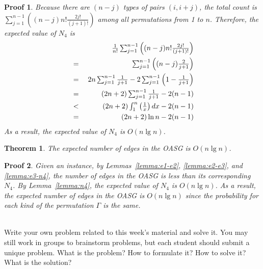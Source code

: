 \documentclass[]{article}
\newtheorem{Proof}{Proof}
\newtheorem{Theorem}{Theorem}
\begin{document}
\begin{qunlist}
{{\begin{Proof}
Because there are $(n-j)$ types of pairs $(i,i+j)$, the total count is $\sum_{j=1}^{n-1}((n-j)n!\frac{2j!}{(j+1)!})$ among all permutations from 1 to $n$. Therefore, the expected value of $N_4$ is
\begin{eqnarray*}
 & {\textstyle        } & {\textstyle \frac{1}{n!}\sum_{j=1}^{n-1}\left((n-j)n!\frac{2j!}{(j+1)!}\right)}            \nonumber\\
 & {\textstyle { }={ }} & {\textstyle \sum_{j=1}^{n-1}\left((n-j)\frac{2}{j+1}\right)}                               \nonumber\\
 & {\textstyle { }={ }} & {\textstyle 2n\sum_{j=1}^{n-1}\frac{1}{j+1}-2\sum_{j=1}^{n-1}\left(1-\frac{1}{j+1}\right)} \nonumber\\
 & {\textstyle { }={ }} & {\textstyle (2n+2)\sum_{j=1}^{n-1}\frac{1}{j+1}-2(n-1)}                                    \nonumber\\
 & {\textstyle { }<{ }} & {\textstyle (2n+2)\int_1^n\left(\frac{1}{x}\right)dx-2(n-1)}                             \nonumber\\
 & {\textstyle { }={ }} & {\textstyle (2n+2)\ln n-2(n-1)}                                                           \nonumber
\end{eqnarray*}
As a result, the expected value of $N_4$ is $O(n\lg n)$.
\end{Proof}

\begin{Theorem}\label{theorem:edge-random-case}
The expected number of edges in the OASG is $O(n\lg n)$.
\end{Theorem}

\begin{Proof}
Given an instance, by Lemmas~\ref{lemma:e1-e2}, \ref{lemma:e2-e3}, and \ref{lemma:e3-n4}, the number of edges in the OASG is less than its corresponding $N_4$. By Lemma~\ref{lemma:n4}, the expected value of $N_4$ is $O(n\lg n)$. As a result, the expected number of edges in the OASG is $O(n\lg n)$ since the probability for each kind of the permutation $\Gamma$ is the same.
\end{Proof}
}} \fi

 \\
Write your own problem related to this week's material and solve it. You may still work in groups to brainstorm problems, but each student should submit a unique problem. What is the problem? How to formulate it? How to solve it? What is the solution?

\end{qunlist}
\end{document}
